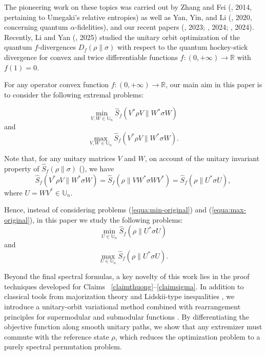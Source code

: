 \documentclass[10pt,reqno]{amsart}
\theoremstyle{break-italic}
\theoremstyle{break-italic}
\theoremstyle{break-italic}
\theoremstyle{break-italic}
\theoremstyle{break-italic}
\theoremstyle{break-italic}
\theoremstyle{break-italic}
\theoremstyle{break-italic}
\theoremstyle{break-roman}
\theoremstyle{standard}
\theoremstyle{varthm-roman}
\theoremstyle{varthm-italic}
\theoremstyle{varthm-roman-break}
\theoremstyle{varthm-italic-break}
\theoremstyle{varthm-roman-no-punctuation}
\theoremstyle{varthm-italic-no-punctuation}
\numberwithin{equation}{section}
\begin{document}
The pioneering work on these topics was carried out by Zhang and Fei (\cite{ZhF}, 2014, pertaining to Umegaki's relative entropies) as well as Yan, Yin, and Li (\cite{YYL}, 2020, concerning quantum $\alpha$-fidelities), and our recent papers (\cite{VHLD}, 2023; \cite{DLV24}, 2024; \cite{LVHD}, 2024). Recently, Li and Yan (\cite{LiYan}, 2025) studied the unitary orbit optimization of the quantum $f$-divergences $D_f(\rho\|\sigma)$ with respect to the quantum hockey-stick divergence for convex and twice differentiable functions $f : (0, +\infty) \rightarrow \mathbb R$ with $f (1) = 0$.


For any operator convex function $f : (0, +\infty) \rightarrow \mathbb R$, our main aim in this paper is to consider the following extremal problems:

\begin{equation}\label{equa:min-original}
  \min_{V, W\in \mathbb U_n}\widehat{S}_f(V^*\rho V\|W^*\sigma W) 
\end{equation}
and 
\begin{equation}\label{equa:max-original}
 \max_{V, W\in \mathbb U_n} \widehat{S}_f(V^*\rho V\| W^*\sigma W).
\end{equation}

Note that, for any unitary matrices $V$ and $W$, on account of  the unitary invariant property of $\widehat{S}_f(\rho\|\sigma)$ (\cite{Hiai2017}), we have
$$\widehat{S}_f(V^*\rho V\| W^*\sigma W)=  \widehat{S}_f(\rho\|VW^*\sigma WV^*) =  \widehat{S}_f(\rho\|U^*\sigma U),$$
	where $U=WV^* \in \mathbb U_n$. 
	
 Hence, instead of considering problems (\ref{equa:min-original}) and (\ref{equa:max-original}), in this paper  we study the following problems: 
	\begin{equation} \label{equ:min}
		\min_{U\in \mathbb U_n} \widehat{S}_f(\rho \| U^*\sigma U)
	\end{equation} 
	and 
	\begin{equation}\label{equ:max}
		\max_{U\in \mathbb U_n} \widehat{S}_f(\rho \|U^*\sigma U).
	\end{equation} 

Beyond the final spectral formulas, a key novelty of this work lies in the proof techniques developed for Claims~ \ref{claimthuong}--\ref{claimsigma}. In addition to classical tools from majorization theory and Lidskii-type inequalities \cite{Bh, MOA}, we introduce a unitary-orbit variational method combined with rearrangement principles for supermodular and submodular functions 
\cite{HLP52,Top98}. By differentiating the objective function along smooth unitary paths, we show that any extremizer must commute with the reference state $\rho$, which reduces the optimization problem to a purely
spectral permutation problem.
\end{document}
